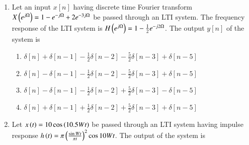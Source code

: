 \documentclass[a4paper, 11pt]{article}
\begin{document}
\begin{enumerate}
    \hfill{}
    
    \item Let an input $x[n]$ having discrete time Fourier transform $X\left(e^{j\Omega}\right) = 1 - e^{-j\Omega} + 2e^{-3j\Omega}$ be passed through an LTI system. The frequency response of the LTI system is $H\left(e^{j\Omega}\right) = 1 - \frac{1}{2}e^{-j2\Omega}$. The output $y[n]$ of the system is
    
    \begin{enumerate}
        \item $\delta[n]+\delta[n-1]-\frac{1}{2}\delta[n-2]-\frac{5}{2}\delta[n-3]+\delta[n-5]$
        \item $\delta[n]-\delta[n-1]-\frac{1}{2}\delta[n-2]-\frac{5}{2}\delta[n-3]+\delta[n-5]$
        \item $\delta[n]-\delta[n-1]-\frac{1}{2}\delta[n-2]+\frac{5}{2}\delta[n-3]-\delta[n-5]$
        \item $\delta[n]+\delta[n-1]+\frac{1}{2}\delta[n-2]+\frac{5}{2}\delta[n-3]+\delta[n-5]$
    \end{enumerate}

    \hfill{}
    
    \item Let $x\left(t\right) = 10 \cos\left(10.5Wt\right)$ be passed through an LTI system having impulse response $h\left(t\right) = \pi \left(\frac{\sin Wt}{\pi t}\right)^2 \cos 10Wt$. The output of the system is
    \begin{enumerate}
    \end{enumerate}
    
    \hfill{}
    

\end{enumerate}
\end{document}
